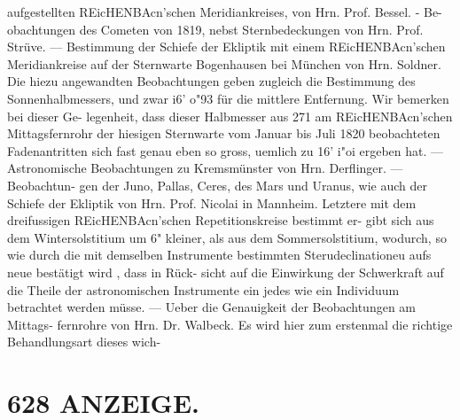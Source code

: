 \documentclass[12pt,a4paper]{article}
\begin{document}
{{{{{{{{aufgestellten  REicHENBAcn'schen  Meridiankreises,  von  Hrn.  Prof.  Bessel.  -  Be- obachtungen des  Cometen  von  1819,  nebst  Sternbedeckungen  von  Hrn.  Prof.  Strüve.  ---  Bestimmung der  Schiefe  der  Ekliptik  mit  einem  REicHENBAcn'schen  Meridiankreise  auf  der  Sternwarte  Bogenhausen bei  München  von  Hrn.  Soldner.  Die  hiezu  angewandten  Beobachtungen  geben  zugleich  die  Bestimmung des  Sonnenhalbmessers,  und  zwar  i6'  o"93  für  die  mittlere  Entfernung.  Wir  bemerken  bei  dieser  Ge- legenheit, dass  dieser  Halbmesser  aus  271  am  REicHENBAcn'schen  Mittagsfernrohr  der  hiesigen  Sternwarte vom  Januar  bis  Juli  1820  beobachteten  Fadenantritten  sich  fast  genau  eben  so  gross,  uemlich  zu  16'  i"oi ergeben  hat.  ---  Astronomische  Beobachtungen  zu  Kremsmünster  von  Hrn.  Derflinger.  ---  Beobachtun- gen der  Juno,  Pallas,  Ceres,  des  Mars  und  Uranus,  wie  auch  der  Schiefe  der  Ekliptik  von  Hrn.  Prof. Nicolai  in  Mannheim.  Letztere  mit  dem  dreifussigen  REicHENBAcn'schen  Repetitionskreise  bestimmt  er- gibt sich  aus  dem  Wintersolstitium  um  6"  kleiner,  als  aus  dem  Sommersolstitium,  wodurch,  so  wie  durch die  mit  demselben  Instrumente  bestimmten  Sterudeclinationeu  aufs  neue  bestätigt  wird ,  dass  in  Rück- sicht auf  die  Einwirkung  der  Schwerkraft  auf  die  Theile  der  astronomischen  Instrumente  ein  jedes  wie ein  Individuum  betrachtet  werden  müsse.  ---  Ueber  die  Genauigkeit  der  Beobachtungen  am  Mittags- fernrohre von  Hrn.  Dr.  Walbeck.     Es  wird  hier  zum  erstenmal  die  richtige  Behandlungsart  dieses  wich-


\section*{628  ANZEIGE.}

}}}}}}}}
\end{document}
